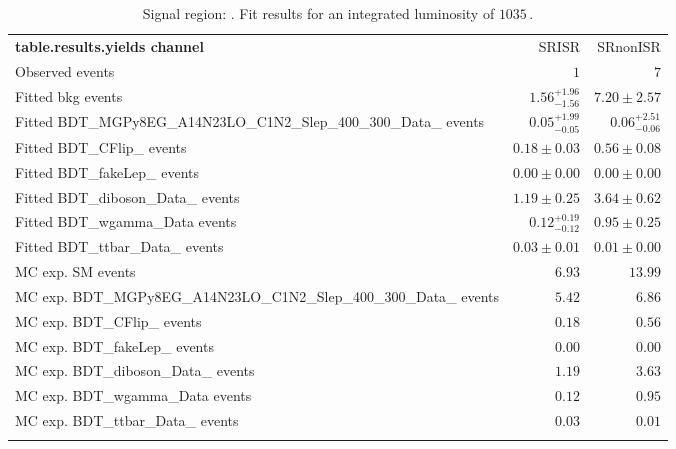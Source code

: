 \begin{table}
\begin{center}
\setlength{\tabcolsep}{0.0pc}
{\small
\begin{tabular*}{\textwidth}{@{\extracolsep{\fill}}lrr}
\noalign{\smallskip}\hline\noalign{\smallskip}
{\bf table.results.yields channel}           & SRISR            & SRnonISR              \\[-0.05cm]
\noalign{\smallskip}\hline\noalign{\smallskip}
Observed events          & $1$              & $7$                    \\
\noalign{\smallskip}\hline\noalign{\smallskip}
Fitted bkg events         & $1.56_{-1.56}^{+1.96}$          & $7.20 \pm 2.57$              \\
\noalign{\smallskip}\hline\noalign{\smallskip}
        Fitted BDT\_MGPy8EG\_A14N23LO\_C1N2\_Slep\_400\_300\_Data\_ events         & $0.05_{-0.05}^{+1.99}$          & $0.06_{-0.06}^{+2.51
}$              \\
        Fitted BDT\_CFlip\_ events         & $0.18 \pm 0.03$          & $0.56 \pm 0.08$              \\
        Fitted BDT\_fakeLep\_ events         & $0.00 \pm 0.00$          & $0.00 \pm 0.00$              \\
        Fitted BDT\_diboson\_Data\_ events         & $1.19 \pm 0.25$          & $3.64 \pm 0.62$              \\
        Fitted BDT\_wgamma\_Data events         & $0.12_{-0.12}^{+0.19}$          & $0.95 \pm 0.25$              \\
        Fitted BDT\_ttbar\_Data\_ events         & $0.03 \pm 0.01$          & $0.01 \pm 0.00$              \\
 \noalign{\smallskip}\hline\noalign{\smallskip}
MC exp. SM events              & $6.93$          & $13.99$              \\
\noalign{\smallskip}\hline\noalign{\smallskip}
        MC exp. BDT\_MGPy8EG\_A14N23LO\_C1N2\_Slep\_400\_300\_Data\_ events         & $5.42$          & $6.86$              \\
        MC exp. BDT\_CFlip\_ events         & $0.18$          & $0.56$              \\
        MC exp. BDT\_fakeLep\_ events         & $0.00$          & $0.00$              \\
        MC exp. BDT\_diboson\_Data\_ events         & $1.19$          & $3.63$              \\
        MC exp. BDT\_wgamma\_Data events         & $0.12$          & $0.95$              \\
        MC exp. BDT\_ttbar\_Data\_ events         & $0.03$          & $0.01$              \\
\noalign{\smallskip}\hline\noalign{\smallskip}
\end{tabular*}
}
\end{center}

\caption{Signal region: . Fit results for an integrated luminosity of $1035$\,\ipb.
}
\label{table.results.systematics.in.logL.fit.table.results.yields}
\end{table}
%



